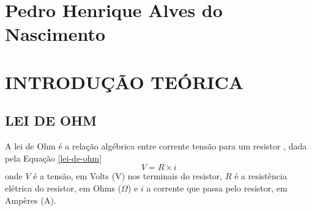 \documentclass[12pt]{article}
\begin{document}
    
    
    \listoftables
    \thispagestyle{empty}
    \newpage

    \listoffigures
    \thispagestyle{empty}
    \newpage

    \tableofcontents
    \thispagestyle{empty}
    \newpage

    \section*{Pedro Henrique Alves do Nascimento}
    \section{INTRODUÇÃO TEÓRICA}
    \subsection{LEI DE OHM}\indent
    
    A lei de Ohm é a relação algébrica entre corrente tensão para um resistor \parencite{nilsson}, dada pela Equação \ref{lei-de-ohm}
    \begin{equation}
        V=R\times i \label{lei-de-ohm}
    \end{equation}
    onde $V$ é a tensão, em Volts (V) nos terminais do resistor, $R$ é a resistência elétrica do resistor, em Ohms ($\Omega$) e $i$ a corrente que passa pelo resistor, em Ampères (A).
\end{document}
